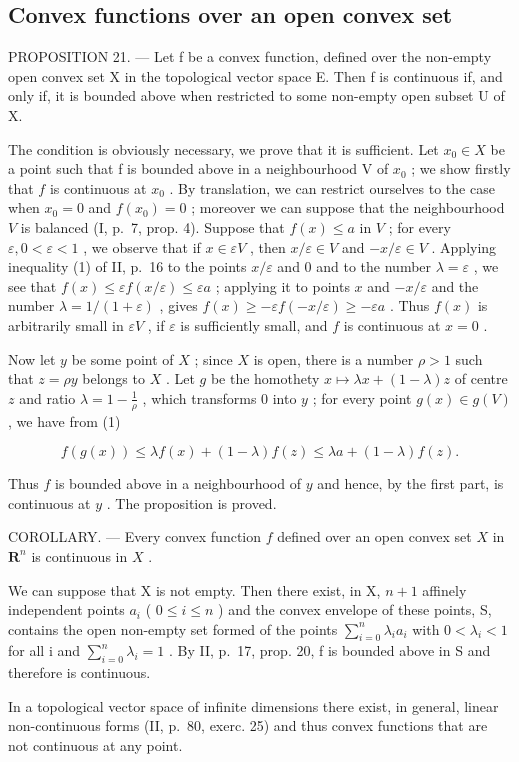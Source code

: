 \subsection{Convex functions over an open convex set}

PROPOSITION 21. --- Let f be a convex function, defined over the non-empty open convex set X in the topological vector space E. Then f is continuous if, and only if, it is bounded above when restricted to some non-empty open subset U of X.

The condition is obviously necessary, we prove that it is sufficient. Let \(x_{0} \in X\) be a point such that f is bounded above in a neighbourhood V of \(x_{0}\) ; we show firstly that \(f\) is continuous at \(x_0\) . By translation, we can restrict ourselves to the case when \(x_0 = 0\) and \(f(x_0) = 0\) ; moreover we can suppose that the neighbourhood \(V\) is balanced (I, p.~7, prop. 4). Suppose that \(f(x) \leqslant a\) in \(V\) ; for every \(\varepsilon, 0 < \varepsilon < 1\) , we observe that if \(x \in \varepsilon V\) , then \(x / \varepsilon \in V\) and \(-x / \varepsilon \in V\) . Applying inequality (1) of II, p.~16 to the points \(x / \varepsilon\) and 0 and to the number \(\lambda = \varepsilon\) , we see that \(f(x) \leqslant \varepsilon f(x / \varepsilon) \leqslant \varepsilon a\) ; applying it to points \(x\) and \(-x / \varepsilon\) and the number \(\lambda = 1 / (1 + \varepsilon)\) , gives \(f(x) \geqslant -\varepsilon f(-x / \varepsilon) \geqslant -\varepsilon a\) . Thus \(f(x)\) is arbitrarily small in \(\varepsilon V\) , if \(\varepsilon\) is sufficiently small, and \(f\) is continuous at \(x = 0\) .

Now let \(y\) be some point of \(X\) ; since \(X\) is open, there is a number \(\rho > 1\) such that \(z = \rho y\) belongs to \(X\) . Let \(g\) be the homothety \(x \mapsto \lambda x + (1 - \lambda)z\) of centre \(z\) and ratio \(\lambda = 1 - \frac{1}{\rho}\) , which transforms 0 into \(y\) ; for every point \(g(x) \in g(V)\) , we have from (1)

\[
f (g (x)) \leqslant \lambda f (x) + (1 - \lambda) f (z) \leqslant \lambda a + (1 - \lambda) f (z).
\]

Thus \(f\) is bounded above in a neighbourhood of \(y\) and hence, by the first part, is continuous at \(y\) . The proposition is proved.

COROLLARY. --- Every convex function \(f\) defined over an open convex set \(X\) in \(\mathbf{R}^n\) is continuous in \(X\) .

We can suppose that X is not empty. Then there exist, in X, \(n + 1\) affinely independent points \(a_{i}\) ( \(0 \leqslant i \leqslant n\) ) and the convex envelope of these points, S, contains the open non-empty set formed of the points \(\sum_{i=0}^{n} \lambda_{i} a_{i}\) with \(0 < \lambda_{i} < 1\) for all i and \(\sum_{i=0}^{n} \lambda_{i} = 1\) . By II, p.~17, prop. 20, f is bounded above in S and therefore is continuous.

In a topological vector space of infinite dimensions there exist, in general, linear non-continuous forms (II, p.~80, exerc. 25) and thus convex functions that are not continuous at any point.

